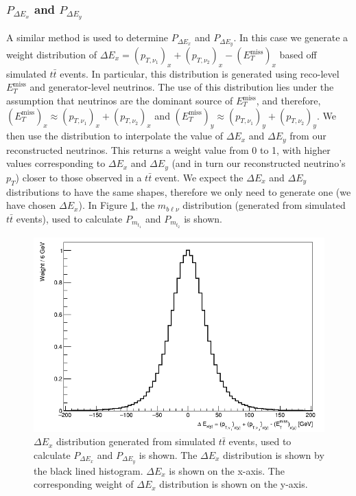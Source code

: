 \subsubsection{$P_{\Delta E_{x}}$ and $P_{\Delta E_{y}}$}
A similar method is used to determine $P_{\Delta E_{x}}$ and $P_{\Delta E_{y}}$. In this case we generate a weight distribution of $\Delta E_{x} = (p_{T,\nu_{1}})_{x} + (p_{T,\nu_{2}})_{x} - (E_{T}^{\text{miss}})_{x}$ based off simulated $t\bar{t}$ events. In particular, this distribution is generated using reco-level $E_{T}^{\text{miss}}$ and generator-level neutrinos. The use of this distribution lies under the assumption that neutrinos are the dominant source of $E_{T}^{\text{miss}}$, and therefore, $(E_{T}^{\text{miss}})_{x} \approx (p_{T,\nu_{1}})_{x} + (p_{T,\nu_{2}})_{x}$ and $(E_{T}^{\text{miss}})_{y} \approx (p_{T,\nu_{1}})_{y} + (p_{T,\nu_{2}})_{y}$. We then use the distribution to interpolate the value of $\Delta E_{x}$ and $\Delta E_{y}$ from our reconstructed neutrinos. This returns a weight value from 0 to 1, with higher values corresponding to $\Delta E_{x}$ and $\Delta E_{y}$ (and in turn our reconstructed neutrino's $p_{T}$) closer to those observed in a $t\bar{t}$ event. We expect the $\Delta E_{x}$ and $\Delta E_{y}$ distributions to have the same shapes, therefore we only need to generate one (we have chosen $\Delta E_{x}$). In Figure \ref{fig:2vSM-deltaE-dist}, the $m_{b\ell\nu}$ distribution (generated from simulated $t\bar{t}$ events), used to calculate $P_{m_{t_{1}}}$ and $P_{m_{t_{2}}}$ is shown.

\begin{figure}[h!]
	\includegraphics[width=0.45\linewidth]{figures/dExy_2vSM.png}
	\centering
	\caption{$\Delta E_{x}$ distribution generated from simulated $t\bar{t}$ events, used to calculate $P_{\Delta E_{x}}$ and $P_{\Delta E_{y}}$ is shown. The $\Delta E_{x}$ distribution is shown by the black lined histogram. $\Delta E_{x}$ is shown on the x-axis. The corresponding weight of $\Delta E_{x}$ distribution is shown on the y-axis. }
	\label{fig:2vSM-deltaE-dist}
\end{figure}

